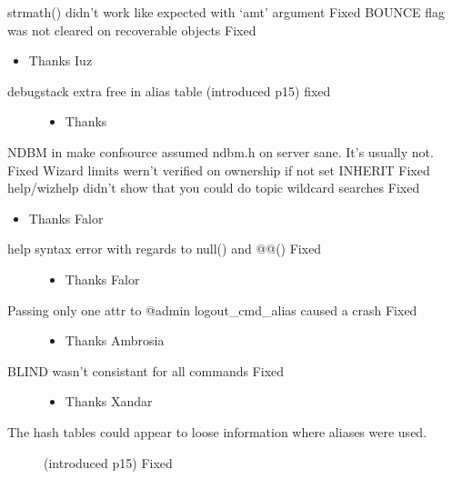 \documentclass[letterpaper,10pt,english]{sphinxmanual}
\begin{document}
\sphinxAtStartPar
strmath() didn’t work like expected with ‘amt’ argument \sphinxhyphen{} Fixed
BOUNCE flag was not cleared on recoverable objects \sphinxhyphen{} Fixed
\begin{itemize}
\item {} 
\sphinxAtStartPar
Thanks Iuz

\end{itemize}
\begin{description}
\item[{debugstack extra free in alias table (introduced p15) \sphinxhyphen{} fixed}] \leavevmode\begin{itemize}
\item {} 
\sphinxAtStartPar
Thanks 

\end{itemize}

\end{description}

\sphinxAtStartPar
NDBM in make confsource assumed ndbm.h on server sane.  It’s usually not. \sphinxhyphen{} Fixed
Wizard limits wern’t verified on ownership if not set INHERIT \sphinxhyphen{} Fixed
help/wizhelp didn’t show that you could do topic wildcard searches \sphinxhyphen{} Fixed
\begin{itemize}
\item {} 
\sphinxAtStartPar
Thanks Falor

\end{itemize}
\begin{description}
\item[{help syntax error with regards to null() and @@() \sphinxhyphen{} Fixed}] \leavevmode\begin{itemize}
\item {} 
\sphinxAtStartPar
Thanks Falor

\end{itemize}

\item[{Passing only one attr to @admin logout\_cmd\_alias caused a crash \sphinxhyphen{} Fixed}] \leavevmode\begin{itemize}
\item {} 
\sphinxAtStartPar
Thanks Ambrosia

\end{itemize}

\item[{BLIND wasn’t consistant for all commands \sphinxhyphen{} Fixed}] \leavevmode\begin{itemize}
\item {} 
\sphinxAtStartPar
Thanks Xandar

\end{itemize}

\item[{The hash tables could appear to loose information where aliases were used.}] \leavevmode
\sphinxAtStartPar
(introduced p15) \sphinxhyphen{} Fixed

\end{description}
\end{document}
